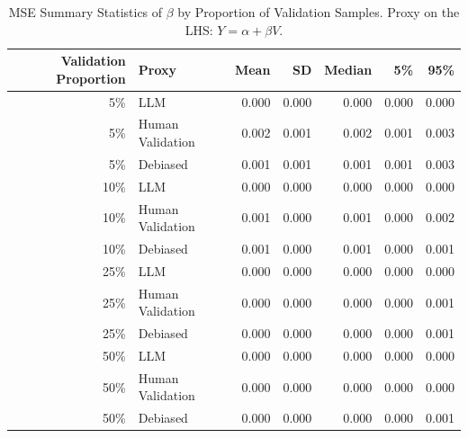 \begin{table}

\caption{MSE Summary Statistics of $\beta$ by Proportion of Validation Samples. Proxy on the LHS: $Y = \alpha + \beta V$.}
\centering
\begin{tabular}[t]{rlrrrrr}
\toprule
Validation Proportion & Proxy & Mean & SD & Median & 5\% & 95\%\\
\midrule
5\% & LLM & 0.000 & 0.000 & 0.000 & 0.000 & 0.000\\
5\% & Human Validation & 0.002 & 0.001 & 0.002 & 0.001 & 0.003\\
5\% & Debiased & 0.001 & 0.001 & 0.001 & 0.001 & 0.003\\
10\% & LLM & 0.000 & 0.000 & 0.000 & 0.000 & 0.000\\
10\% & Human Validation & 0.001 & 0.000 & 0.001 & 0.000 & 0.002\\
10\% & Debiased & 0.001 & 0.000 & 0.001 & 0.000 & 0.001\\
25\% & LLM & 0.000 & 0.000 & 0.000 & 0.000 & 0.000\\
25\% & Human Validation & 0.000 & 0.000 & 0.000 & 0.000 & 0.001\\
25\% & Debiased & 0.000 & 0.000 & 0.000 & 0.000 & 0.001\\
50\% & LLM & 0.000 & 0.000 & 0.000 & 0.000 & 0.000\\
50\% & Human Validation & 0.000 & 0.000 & 0.000 & 0.000 & 0.000\\
50\% & Debiased & 0.000 & 0.000 & 0.000 & 0.000 & 0.001\\
\bottomrule
\end{tabular}
\end{table}
